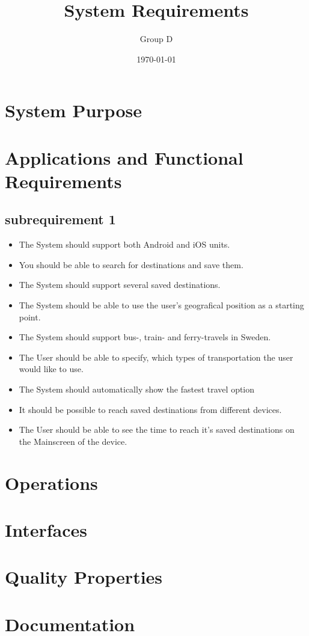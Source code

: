 \documentclass[a4paper]{article}
\title{System Requirements}
\author{Group D}
\date{\today}
\begin{document}
	\maketitle
	\thispagestyle{empty}
	\setcounter{page}{0}
	\pagebreak
	\tableofcontents
	\pagebreak
	

	\section{System Purpose} %
	\section{Applications and Functional Requirements}
	\subsection{subrequirement 1}
	\begin{itemize}
			\item The System should support both Android and iOS units.
			\item You should be able to search for destinations and save them.
			\item The System should support several saved destinations.
			\item The System should be able to use the user's geografical position as a starting point.
			\item The System should support bus-, train- and ferry-travels in Sweden.
			\item The User should be able to specify, which types of transportation the user would like to use. 
			\item The System should automatically show the fastest travel option
			\item It should be possible to reach saved destinations from different devices.
			\item The User should be able to see the time to reach it's saved destinations on the Mainscreen of the device.
		\end{itemize}
	\section{Operations}
	\section{Interfaces}
	\section{Quality Properties}
	\section{Documentation}
	
\end{document}
